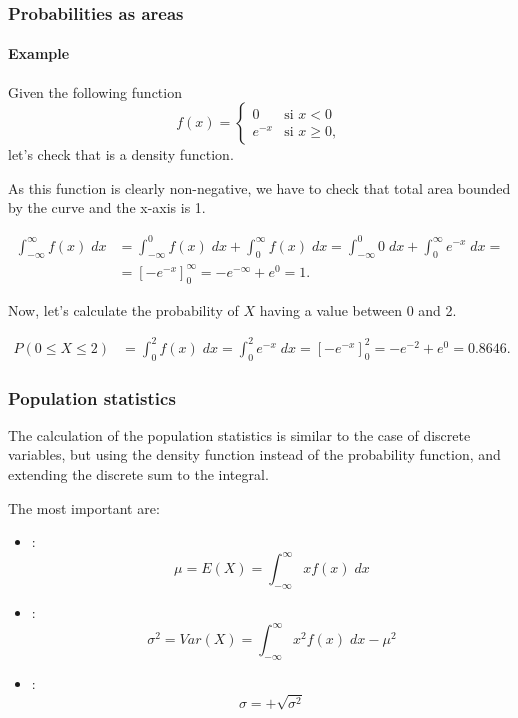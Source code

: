 \begin{frame}
\frametitle{Probabilities as areas}
\framesubtitle{Example}
Given the following function
\[
f(x) =
\begin{cases}
0 & \mbox{si $x<0$}\\
e^{-x} & \mbox{si $x\geq 0$},
\end{cases}
\]
let's check that is a density function. 

As this function is clearly non-negative, we have to check that total area bounded by the curve and the x-axis is 1.

\begin{align*}
\int_{-\infty}^\infty f(x)\;dx &= \int_{-\infty}^0 f(x)\;dx +\int_0^\infty f(x)\;dx = \int_{-\infty}^0 0\;dx +\int_0^\infty e^{-x}\;dx =\\
&= \left[-e^{-x}\right]_0^{\infty} = -e^{-\infty}+e^0 = 1.
\end{align*}

Now, let's calculate the probability of $X$ having a value between 0 and 2. 

\begin{align*}
P(0\leq X\leq 2) &= \int_0^2 f(x)\;dx = \int_0^2 e^{-x}\;dx = \left[-e^{-x}\right]_0^2 = -e^{-2}+e^0 = 0.8646.
\end{align*}
\end{frame}


\begin{frame}
\frametitle{Population statistics}
The calculation of the population statistics is similar to the case of discrete variables, but using the density function instead of the probability function, and extending the discrete sum to the integral.

The most important are:
\begin{itemize}
\item {}:
\[
\mu = E(X) = \int_{-\infty}^\infty x f(x)\; dx
\]
\item {}:
\[
\sigma^2 = Var(X) = \int_{-\infty}^\infty x^2f(x)\; dx -\mu^2
\]
\item {}:
\[
\sigma = +\sqrt{\sigma^2}
\]
\end{itemize}
\end{frame}


